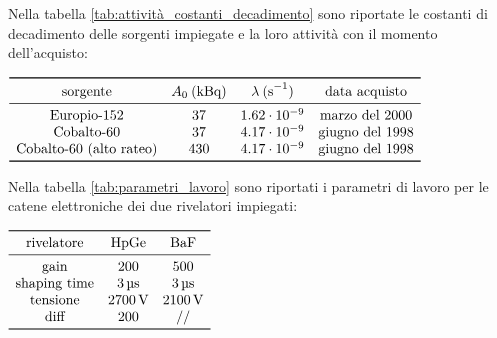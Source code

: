 \documentclass{article}
\begin{document}
        Nella tabella \ref{tab:attività_costanti_decadimento} sono riportate le costanti di decadimento delle sorgenti impiegate e la loro attività con il momento dell'acquisto:
        \begin{table}[h!]
                \centering
                \caption{attività e costanti di decadimento europio-152 e cobalto-60}
                \label{tab:attività_costanti_decadimento}
                $
                \begin{array}{cccc}
                    \toprule
                    \text{sorgente}       & A_0\:\si{(\kilo\becquerel)}      & \lambda\:\si{(\second^{-1})}  &\text{data acquisto}\\
                    \midrule
                    \text{Europio-152}&37&1.62\cdot10^{-9}&\text{marzo del 2000}\\
                    \text{Cobalto-60}&37&4.17\cdot10^{-9}&\text{giugno del 1998}\\
                    \text{Cobalto-60 (alto rateo)}&430&4.17\cdot10^{-9}&\text{giugno del 1998}\\
                    \bottomrule
                \end{array}
                $
            \end{table}

        \newpage
        Nella tabella \ref{tab:parametri_lavoro} sono riportati i parametri di lavoro per le catene elettroniche dei due rivelatori impiegati:
        \begin{table}[h!]
            \centering
            \caption{parametri di lavoro}
            \label{tab:parametri_lavoro}
            $
            \begin{array}{ccc}
                \toprule
                \text{rivelatore}&\text{HpGe}&\text{BaF}\\
                \midrule
                \text{gain}&\SI{200}{}&\SI{500}{}\\
                \text{shaping time}&\SI{3}{\micro\second}&\SI{3}{\micro\second}\\
                \text{tensione}&\SI{2700}{\volt}&\SI{2100}{\volt}\\
                \text{diff}&200&\text{//}\\
                \bottomrule
            \end{array}
            $
        \end{table}
\end{document}
